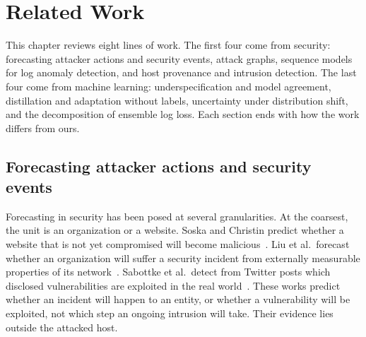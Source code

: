 \chapter{Related Work}
\label{ch:related}

This chapter reviews eight lines of work. The first four come from
security: forecasting attacker actions and security events, attack
graphs, sequence models for log anomaly detection, and host provenance
and intrusion detection. The last four come from machine learning:
underspecification and model agreement, distillation and adaptation
without labels, uncertainty under distribution shift, and the
decomposition of ensemble log loss. Each section ends with how the
work differs from ours.

\section{Forecasting attacker actions and security events}
\label{sec:related-forecasting}

Forecasting in security has been posed at several granularities. At the
coarsest, the unit is an organization or a website. Soska and Christin
predict whether a website that is not yet compromised will become
malicious~\cite{soska2014automatically}.
Liu et al.\ forecast whether an
organization will suffer a security incident from externally measurable
properties of its network~\cite{liu2015cloudy}.
Sabottke et al.\ detect from Twitter posts which disclosed
vulnerabilities are exploited in the real world~\cite{sabottke2015vulnerability}.
These works predict whether an
incident will happen to an entity, or whether a vulnerability will be
exploited, not which step an ongoing intrusion will take. Their
evidence lies outside the attacked host.

